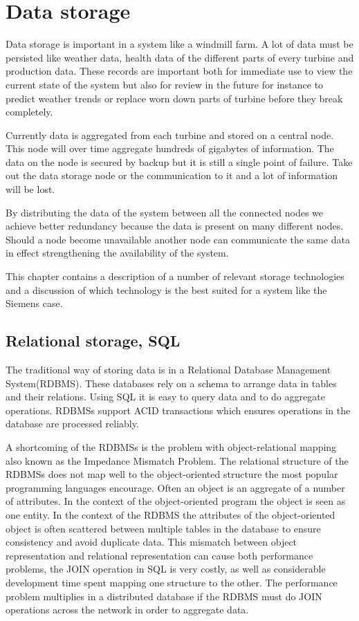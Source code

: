 \chapter{Data storage}
Data storage is important in a system like a windmill farm.
A lot of data must be persisted like weather data, health data of the different parts of every turbine and production data.
These records are important both for immediate use to view the current state of the system but also for review in the future for instance to predict weather trends or replace worn down parts of turbine before they break completely.

Currently data is aggregated from each turbine and stored on a central node.
This node will over time aggregate hundreds of gigabytes of information.
The data on the node is secured by backup but it is still a single point of failure.
Take out the data storage node or the communication to it and a lot of information will be lost.

By distributing the data of the system between all the connected nodes we achieve better redundancy because the data is present on many different nodes.
Should a node become unavailable another node can communicate the same data in effect strengthening the availability of the system.

This chapter contains a description of a number of relevant storage technologies and a discussion of which technology is the best suited for a system like the Siemens case.

\section{Relational storage, SQL}
\label{sec:sql}
The traditional way of storing data is in a Relational Database Management System(RDBMS).
These databases rely on a schema to arrange data in tables and their relations.
Using SQL it is easy to query data and to do aggregate operations.
RDBMSs support ACID transactions which ensures operations in the database are processed reliably.

A shortcoming of the RDBMSs is the problem with object-relational mapping also known as the Impedance Mismatch Problem\cite{Fowler:IntroNoSQL, Neward:TheVietnamOfComputerScience}.
The relational structure of the RDBMSs does not map well to the object-oriented structure the most popular programming languages encourage.
Often an object is an aggregate of a number of attributes.
In the context of the object-oriented program the object is seen as one entity.
In the context of the RDBMS the attributes of the object-oriented object is often scattered between multiple tables in the database to ensure consistency and avoid duplicate data.
This mismatch between object representation and relational representation can cause both performance problems, the JOIN operation in SQL is very costly, as well as considerable development time spent mapping one structure to the other.
The performance problem multiplies in a distributed database if the RDBMS must do JOIN operations across the network in order to aggregate data.

